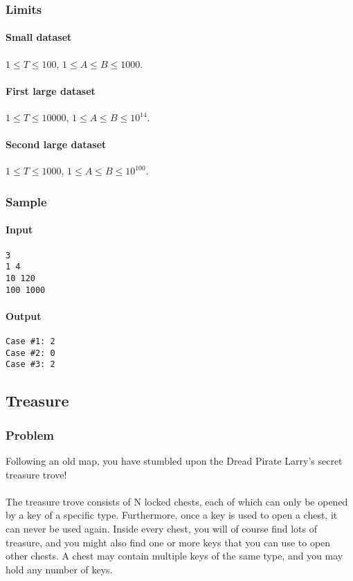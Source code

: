 \documentclass[titlepage]{article}
\begin{document}
\subsubsection{Limits}

\paragraph{Small dataset}
$1\leq T\leq100$, $1\leq A\leq B\leq1000$.

\paragraph{First large dataset}
$1\leq T\leq10000$, $1\leq A\leq B\leq10^{14}$.

\paragraph{Second large dataset}
$1\leq T\leq1000$, $1\leq A\leq B\leq10^{100}$.

\subsubsection{Sample}

\paragraph{Input}
\begin{verbatim}
3
1 4
10 120
100 1000
\end{verbatim}

\paragraph{Output}
\begin{verbatim}
Case #1: 2
Case #2: 0
Case #3: 2
\end{verbatim}

\subsection{Treasure}

\subsubsection{Problem}
Following an old map, you have stumbled upon the Dread Pirate Larry's secret treasure trove!
\paragraph{}
The treasure trove consists of N locked chests, each of which can only be opened by a key of a specific type. Furthermore, once a key is used to open a chest, it can never be used again. Inside every chest, you will of course find lots of treasure, and you might also find one or more keys that you can use to open other chests. A chest may contain multiple keys of the same type, and you may hold any number of keys.
\end{document}
